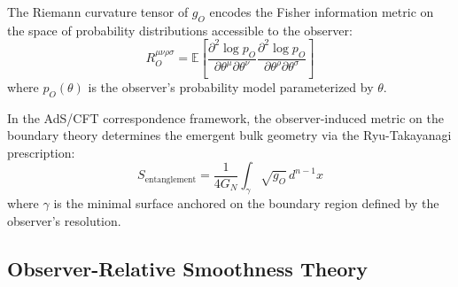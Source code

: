 \begin{corollary}\label{cor:bk4_information_curvature}
The Riemann curvature tensor of $g_O$ encodes the Fisher information metric on the space of probability distributions accessible to the observer:
\begin{equation}
    R_O^{\mu\nu\rho\sigma} = \mathbb{E}\left[\frac{\partial^2 \log p_O}{\partial \theta^\mu \partial \theta^\nu} \frac{\partial^2 \log p_O}{\partial \theta^\rho \partial \theta^\sigma}\right]
\end{equation}
where $p_O(\theta)$ is the observer's probability model parameterized by $\theta$.
\end{corollary}

\begin{proposition}\label{prop:bk4_holographic_emergence}
In the AdS/CFT correspondence framework, the observer-induced metric on the boundary theory determines the emergent bulk geometry via the Ryu-Takayanagi prescription:
\begin{equation}
    S_{\text{entanglement}} = \frac{1}{4G_N} \int_{\gamma} \sqrt{g_O} \, d^{n-1}x
\end{equation}
where $\gamma$ is the minimal surface anchored on the boundary region defined by the observer's resolution.
\end{proposition}

\subsection{Observer-Relative Smoothness Theory}

